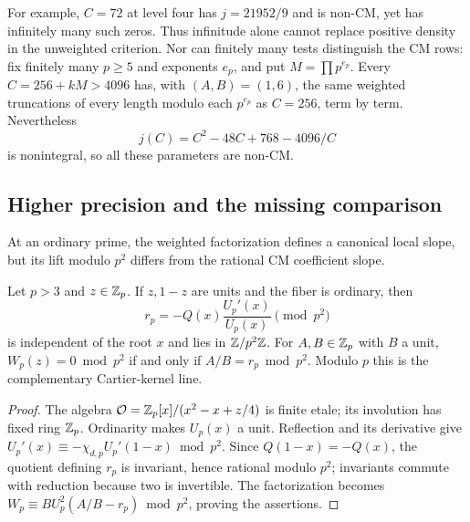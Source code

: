 For example, $C=72$ at level four has $j=21952/9$ and is non-CM,
yet has infinitely many such zeros.  Thus infinitude alone cannot
replace positive density in the unweighted criterion.
Nor can finitely many tests distinguish the CM rows: fix finitely
many $p\ge5$ and exponents $e_p$, and put $M=\prod p^{e_p}$.
Every $C=256+kM>4096$ has, with $(A,B)=(1,6)$, the same
weighted truncations of every length modulo each $p^{e_p}$ as
$C=256$, term by term.  Nevertheless
\[
                  j(C)=C^2-48C+768-4096/C
\]
is nonintegral, so all these parameters are non-CM.

\subsection{Higher precision and the missing comparison}
\label{subsec:precision-versus-transfer}
At an ordinary prime, the weighted factorization defines a
canonical local slope, but its lift modulo $p^2$ differs from
the rational CM coefficient slope.

\begin{proposition}
\label{prop:local-slope-p2}
Let $p>3$ and $z\in\mathbb Z_p$. If $z,1-z$ are units and the fiber is ordinary, then
\[
                  r_p=-Q(x)\frac{U_p'(x)}{U_p(x)}\pmod{p^2}
\]
is independent of the root $x$ and lies in $\mathbb Z/p^2\mathbb Z$.
For $A,B\in\mathbb Z_p$ with $B$ a unit,
$W_p(z)=0\bmod p^2$ if and only if $A/B=r_p\bmod p^2$.
Modulo $p$ this is the complementary Cartier-kernel line.
\end{proposition}
\begin{proof}
The algebra $\mathcal O=\mathbb Z_p[x]/(x^2-x+z/4)$ is finite etale;
its involution has fixed ring $\mathbb Z_p$.  Ordinarity makes $U_p(x)$
a unit.  Reflection and its derivative give
$U_p'(x)\equiv-\chi_{d,p}U_p'(1-x)\bmod p^2$.
Since $Q(1-x)=-Q(x)$, the quotient defining $r_p$ is invariant,
hence rational modulo $p^2$; invariants commute with reduction
because two is invertible.  The factorization becomes
$W_p\equiv BU_p^2(A/B-r_p)\bmod p^2$, proving the assertions.
\end{proof}

